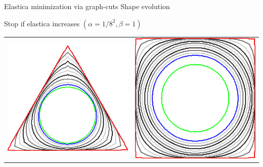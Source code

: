 \begin{frame}
{Elastica minimization via graph-cuts}
{Shape evolution}

\begin{center}
Stop if elastica increases $(\alpha=1/8^2,\beta=1)$\\[1em]

\begin{tabular}{cc}
\includegraphics[scale=0.1]{figures/graphcut/no-neighborhood-flow-always-improve/0.015625/triangle.png}\hspace{3em} &
\includegraphics[scale=0.08]{figures/graphcut/no-neighborhood-flow-always-improve/0.015625/square.png}\\[2em]

\end{tabular}
\end{center}
\end{frame}
